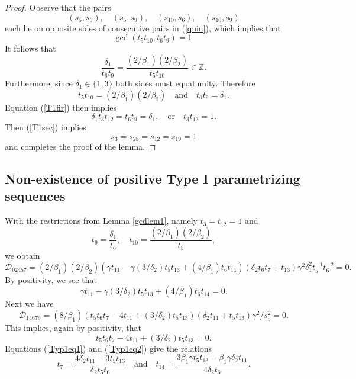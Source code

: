\documentclass[letterpaper,10pt]{amsart}
\newcommand{\bZ}{{\mathbb{Z}}}
\newcommand{\D}{{\mathcal{D}}}
\theoremstyle{definition}
\numberwithin{equation}{section}
\begin{document}
\begin{proof}

Observe that the pairs
\[(s_5, s_6), \quad (s_5, s_9), \quad (s_{10}, s_{6}), \quad (s_{10}, s_9)\]
each lie on opposite sides of consecutive pairs in (\ref{quin}), which implies that 
\[\gcd(t_5 t_{10}, t_6 t_9) = 1.\]
It follows that 
\[\frac{\delta_1}{t_6 t_9} = \frac{(2/\beta_1)(2/\beta_2)}{t_5 t_{10}} \in \bZ.\]
Furthermore, since $\delta_1 \in \{1,3\}$ both sides must equal unity. Therefore
\begin{equation} \label{T1fir} t_5 t_{10} = (2/\beta_1)(2/\beta_2) \quad \text{and} \quad  t_6 t_9 = \delta_1.
\end{equation}
Equation (\ref{T1fir}) then implies 
\begin{equation} \label{T1sec} \delta_1 t_3 t_{12} = t_6 t_9 = \delta_1, \quad \text{or} \quad t_3 t_{12} = 1.
\end{equation}
Then (\ref{T1sec}) implies 
\[s_3 = s_{28} = s_{12} = s_{19} = 1\]
and completes the proof of the lemma. \end{proof} 

\subsection{Non-existence of positive Type I parametrizing sequences}


With the restrictions from Lemma \ref{gcdlem1}, namely $t_3 = t_{12} = 1$
and 
\[t_9 = \frac{\delta_1}{t_6}, \quad t_{10} = \frac{(2/\beta_1)(2/\beta_2)}{t_5},\]
we obtain  
\[\D_{02457} = (2/\beta_1)(2/\beta_2) ( \gamma t_{11} -  \gamma (3/\delta_2) t_5 t_{13} + (4/\beta_1) t_6 t_{14}) (\delta_2 t_6 t_7 + t_{13}) \gamma^2 \delta_1^2 t_5^{-1} t_6^{-2}  = 0.\]
By positivity, we see that 
\begin{equation} \label{Typ1eq1}  \gamma t_{11} -  \gamma (3/\delta_2) t_5 t_{13} + (4/\beta_1) t_6 t_{14} = 0.\end{equation}
Next we have 
\[\D_{14679} = (8/\beta_1) ( t_5 t_6 t_7 - 4  t_{11} + (3/\delta_2) t_5 t_{13}) (\delta_2 t_{11} + t_5 t_{13}) \gamma^2/s_5^2 = 0.\]
This implies, again by positivity, that 
\begin{equation} \label{Typ1eq2} t_5 t_6 t_7 - 4  t_{11} + (3/\delta_2) t_5 t_{13} = 0.\end{equation} 
Equations (\ref{Typ1eq1}) and (\ref{Typ1eq2}) give the relations
\begin{equation} \label{t7t14}t_7 = \frac{4 \delta_2 t_{11} - 3 t_5 t_{13}}{\delta_2 t_5 t_6} \quad \text{and} \quad t_{14} = \frac{3 \beta_1 \gamma t_5 t_{13} - \beta_1 \gamma \delta_2 t_{11}}{4 \delta_2 t_6}. \end{equation}
\end{document}
